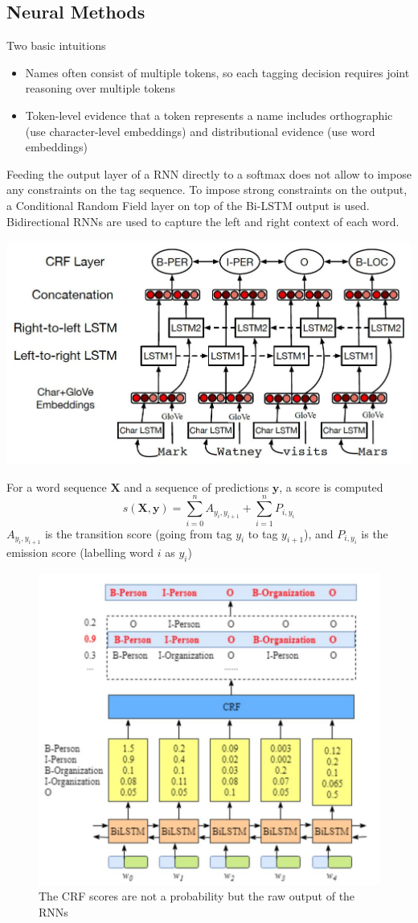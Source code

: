 \documentclass[11pt]{article}
\begin{document}
\subsection{Neural Methods}
Two basic intuitions
\begin{itemize}
	\item Names often consist of multiple tokens, so each tagging decision requires joint reasoning over multiple tokens
	\item Token-level evidence that a token represents a name includes orthographic (use character-level embeddings) and distributional evidence (use word embeddings)
\end{itemize}
Feeding the output layer of a RNN directly to a softmax does not allow to impose any constraints on the tag sequence. To impose strong constraints on the output, a Conditional Random Field layer on top of the Bi-LSTM output is used. Bidirectional RNNs are used to capture the left and right context of each word.
\begin{center}
	\includegraphics[width=0.6\linewidth]{img/BiLSTM_CRF}
\end{center}
For a word sequence $\textbf{X}$ and a sequence of predictions $\textbf{y}$, a score is computed
\begin{equation*}
	s(\textbf{X},\textbf{y}) = \sum_{i=0}^{n}A_{y_i,y_{i+1}} + \sum_{i=1}^{n} P_{i,y_i}
\end{equation*}
$A_{y_i,y_{i+1}}$ is the transition score (going from tag $y_i$ to tag $y_{i+1}$), and $P_{i,y_i}$ is the emission score (labelling word $i$ as $y_i$)

\begin{figure}[H]
	\centering
	\includegraphics[width=0.4\linewidth]{img/BiLSTM_CRF_scores}
	\caption{The CRF scores are not a probability but the raw output of the RNNs}
	\label{fig:bilstmcrfscores}
\end{figure}
\end{document}
